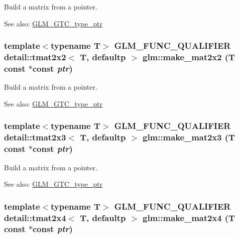 Build a matrix from a pointer. \begin{Desc}
\item[See also:]\hyperlink{group__gtc__type__ptr}{GLM\_\-GTC\_\-type\_\-ptr} \end{Desc}
\hypertarget{group__gtc__type__ptr_g49c18920c113e1e72caea1c3978c8e7f}{
\subsubsection[make\_\-mat2x2]{\setlength{\rightskip}{0pt plus 5cm}template$<$typename T$>$ GLM\_\-FUNC\_\-QUALIFIER detail::tmat2x2$<$ T, defaultp $>$ glm::make\_\-mat2x2 (T const $\ast$const  {\em ptr})}}
\label{group__gtc__type__ptr_g49c18920c113e1e72caea1c3978c8e7f}


Build a matrix from a pointer. \begin{Desc}
\item[See also:]\hyperlink{group__gtc__type__ptr}{GLM\_\-GTC\_\-type\_\-ptr} \end{Desc}
\hypertarget{group__gtc__type__ptr_g86620b90c993ff8e31f0dff1611bd2da}{
\subsubsection[make\_\-mat2x3]{\setlength{\rightskip}{0pt plus 5cm}template$<$typename T$>$ GLM\_\-FUNC\_\-QUALIFIER detail::tmat2x3$<$ T, defaultp $>$ glm::make\_\-mat2x3 (T const $\ast$const  {\em ptr})}}
\label{group__gtc__type__ptr_g86620b90c993ff8e31f0dff1611bd2da}


Build a matrix from a pointer. \begin{Desc}
\item[See also:]\hyperlink{group__gtc__type__ptr}{GLM\_\-GTC\_\-type\_\-ptr} \end{Desc}
\hypertarget{group__gtc__type__ptr_g50245f47c0e6f5a2ab5ce157dc3e97ac}{
\subsubsection[make\_\-mat2x4]{\setlength{\rightskip}{0pt plus 5cm}template$<$typename T$>$ GLM\_\-FUNC\_\-QUALIFIER detail::tmat2x4$<$ T, defaultp $>$ glm::make\_\-mat2x4 (T const $\ast$const  {\em ptr})}}
\label{group__gtc__type__ptr_g50245f47c0e6f5a2ab5ce157dc3e97ac}


